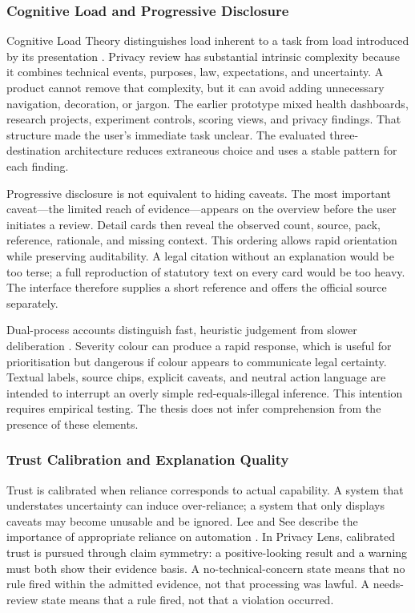 \subsubsection{Cognitive Load and Progressive Disclosure}

Cognitive Load Theory distinguishes load inherent to a task from load introduced by its presentation \cite{27}. Privacy review has substantial intrinsic complexity because it combines technical events, purposes, law, expectations, and uncertainty. A product cannot remove that complexity, but it can avoid adding unnecessary navigation, decoration, or jargon. The earlier prototype mixed health dashboards, research projects, experiment controls, scoring views, and privacy findings. That structure made the user's immediate task unclear. The evaluated three-destination architecture reduces extraneous choice and uses a stable pattern for each finding.

Progressive disclosure is not equivalent to hiding caveats. The most important caveat---the limited reach of evidence---appears on the overview before the user initiates a review. Detail cards then reveal the observed count, source, pack, reference, rationale, and missing context. This ordering allows rapid orientation while preserving auditability. A legal citation without an explanation would be too terse; a full reproduction of statutory text on every card would be too heavy. The interface therefore supplies a short reference and offers the official source separately.

Dual-process accounts distinguish fast, heuristic judgement from slower deliberation \cite{22}. Severity colour can produce a rapid response, which is useful for prioritisation but dangerous if colour appears to communicate legal certainty. Textual labels, source chips, explicit caveats, and neutral action language are intended to interrupt an overly simple red-equals-illegal inference. This intention requires empirical testing. The thesis does not infer comprehension from the presence of these elements.

\subsubsection{Trust Calibration and Explanation Quality}

Trust is calibrated when reliance corresponds to actual capability. A system that understates uncertainty can induce over-reliance; a system that only displays caveats may become unusable and be ignored. Lee and See describe the importance of appropriate reliance on automation \cite{34}. In Privacy Lens, calibrated trust is pursued through claim symmetry: a positive-looking result and a warning must both show their evidence basis. A no-technical-concern state means that no rule fired within the admitted evidence, not that processing was lawful. A needs-review state means that a rule fired, not that a violation occurred.


